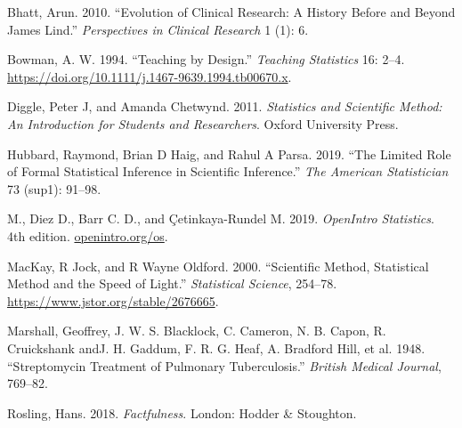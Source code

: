 \documentclass[
]{book}
\newlength{\cslhangindent}
\newenvironment{CSLReferences}[2] %
 {\begin{list}{}{%
  \setlength{\itemindent}{0pt}
  \setlength{\leftmargin}{0pt}
  \setlength{\parsep}{0pt}
  \ifodd #1
   \setlength{\leftmargin}{\cslhangindent}
   \setlength{\itemindent}{-1\cslhangindent}
  \fi
  \setlength{\itemsep}{#2\baselineskip}}}
 {\end{list}}
\begin{document}
\label{refs}
\begin{CSLReferences}{1}{0}
Bhatt, Arun. 2010. {``Evolution of Clinical Research: A History Before and Beyond James Lind.''} \emph{Perspectives in Clinical Research} 1 (1): 6.

Bowman, A. W. 1994. {``Teaching by Design.''} \emph{Teaching Statistics} 16: 2--4. \url{https://doi.org/10.1111/j.1467-9639.1994.tb00670.x}.

Diggle, Peter J, and Amanda Chetwynd. 2011. \emph{Statistics and Scientific Method: An Introduction for Students and Researchers}. Oxford University Press.

Hubbard, Raymond, Brian D Haig, and Rahul A Parsa. 2019. {``The Limited Role of Formal Statistical Inference in Scientific Inference.''} \emph{The American Statistician} 73 (sup1): 91--98.

M., Diez D., Barr C. D., and Çetinkaya-Rundel M. 2019. \emph{OpenIntro Statistics}. 4th edition. \href{https://openintro.org/os}{openintro.org/os}.

MacKay, R Jock, and R Wayne Oldford. 2000. {``Scientific Method, Statistical Method and the Speed of Light.''} \emph{Statistical Science}, 254--78. \url{https://www.jstor.org/stable/2676665}.

Marshall, Geoffrey, J. W. S. Blacklock, C. Cameron, N. B. Capon, R. Cruickshank andJ. H. Gaddum, F. R. G. Heaf, A. Bradford Hill, et al. 1948. {``Streptomycin Treatment of Pulmonary Tuberculosis.''} \emph{British Medical Journal}, 769--82.

Rosling, Hans. 2018. \emph{Factfulness}. London: Hodder \& Stoughton.

\end{CSLReferences}
\end{document}
